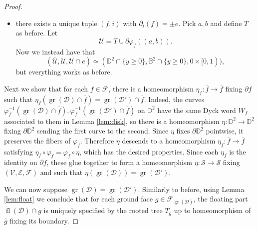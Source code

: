 \documentclass[10pt,a4paper]{amsart}
\newcommand*{\bbB}{\mathbb{B}}
\newcommand*{\bbD}{\mathbb{D}}
\newcommand*{\calD}{\mathcal{D}}
\newcommand*{\calE}{\mathcal{E}}
\newcommand*{\calF}{\mathcal{F}}
\newcommand*{\calS}{\mathcal{S}}
\newcommand*{\calU}{\mathcal{U}}
\newcommand*{\calV}{\mathcal{V}}
\DeclareMathOperator{\fl}{fl}
\DeclareMathOperator{\gr}{gr}
\begin{document}
\begin{proof}
\begin{itemize}
        Next, let
        \[a'=(\partial\varphi_{f'}|_{(t_{i'-1},t_{i'})})^{-1}(\partial\varphi_f|_{(t_{i-1},t_i)}(a)),\quad b'=(\partial\varphi_{f'}|_{(t_{i'-1},t_{i'})})^{-1}(\partial\varphi_f|_{(t_{i-1},t_i)}(b))\]
        and likewise define
        \[T'=\varphi_{f'}(\{(r\cos(2\pi t),r\sin(2\pi t))\mid r\in(0,1),t\in(a',b')\})\subset\Delta_{i'}(f').\]
        Finally, let
        \[\calU=T\cup T'\cup\partial\varphi_f((a,b)).\]
        Then, we have that $\calU$ is open, $\calU\cap e=\partial\varphi_f((a,b))$ is connected containing both $\calD\cap e,\calD'\cap e$, which satisfies the equalities \eqref{eq:closureU}. Moreover,
        \[(\overline{\calU},\calU,\calU\cap e)\simeq(\bbD^2,\bbB^2,0\times(-1,1))\]
        so it is easy to find a homeomorphism $\overline{\calU}\to\overline{\calU}$ with the desired properties.
        \item[$\underline{e\subset\partial\calS}$:] there exists a unique tuple $(f,i)$ with $\partial_i(f)=\pm e$. Pick $a,b$ and define $T$ as before. Let
        \[\calU=T\cup\partial\varphi_f((a,b)).\]
        Now we instead have that
        \[(\overline{\calU},\calU,\calU\cap e)\simeq(\bbD^2\cap\{y\ge0\},\bbB^2\cap\{y\ge0\},0\times[0,1)),\]
        but everything works as before.
    \end{itemize}

    Next we show that for each $f\in\calF$, there is a homeomorphism $\eta_f\colon\overline{f}\to\overline{f}$ fixing $\partial f$ such that $\eta_f(\gr(\calD)\cap\overline{f})=\gr(\calD')\cap\overline{f}$. Indeed, the curves $\varphi_f^{-1}(\gr(\calD)\cap\overline{f}), \varphi_f^{-1}(\gr(\calD')\cap\overline{f})$ on $\bbD^2$ have the same Dyck word $W_f$ associated to them in Lemma \ref{lem:disk}, so there is a homeomorphism $\eta\colon\bbD^2\to\bbD^2$ fixing $\partial\bbD^2$ sending the first curve to the second. Since $\eta$ fixes $\partial\bbD^2$ pointwise, it preserves the fibers of $\varphi_f$. Therefore $\eta$ descends to a homeomorphism $\eta_f\colon\overline{f}\to\overline{f}$ satisfying $\eta_f\circ\varphi_f=\varphi_f\circ\eta$, which has the desired properties. Since each $\eta_f$ is the identity on $\partial f$, these glue together to form a homeomorphism $\eta\colon\calS\to\calS$ fixing $(\calV,\calE,\calF)$ and such that $\eta(\gr(\calD))=\gr(\calD')$.

    We can now suppose $\gr(\calD)=\gr(\calD')$. Similarly to before, using Lemma \ref{lem:float} we conclude that for each ground face $g\in\calF_{\gr(\calD)}$, the floating part $\fl(\calD)\cap g$ is uniquely specified by the rooted tree $T_g$ up to homeomorphism of $\overline{g}$ fixing its boundary.
\end{proof}
\end{document}
